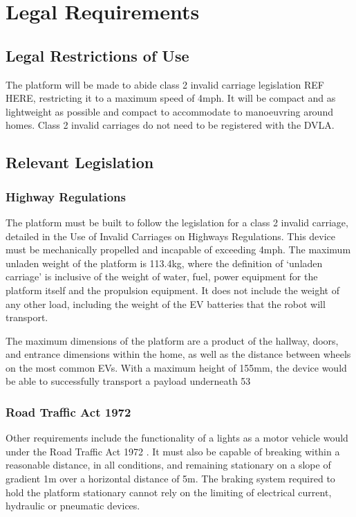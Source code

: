 \documentclass [12pt]{article}
\begin{document}
\section{Legal Requirements}
\subsection{Legal Restrictions of Use}
The platform will be made to abide class 2 invalid carriage legislation REF HERE, restricting it to a maximum speed of 4mph. It will be compact and as lightweight as possible and compact to accommodate to manoeuvring around homes. Class 2 invalid carriages do not need to be registered with the DVLA.

\subsection{Relevant Legislation}
\subsubsection{Highway Regulations}
The platform must be built to follow the legislation for a class 2 invalid carriage, detailed in the Use of Invalid Carriages \cite{Invalid_Legislation} on Highways Regulations. This device must be mechanically propelled and incapable of exceeding 4mph. The maximum unladen weight of the platform is 113.4kg, where the definition of ‘unladen carriage’ is inclusive of the weight of water, fuel, power equipment for the platform itself and the propulsion equipment. It does not include the weight of any other load, including the weight of the EV batteries that the robot will transport.

The maximum dimensions of the platform are a product of the hallway, doors, and entrance dimensions within the home, as well as the distance between wheels on the most common EVs. With a maximum height of 155mm, the device would be able to successfully transport a payload underneath 53%

\subsubsection{Road Traffic Act 1972}
Other requirements include the functionality of a lights as a motor vehicle would under the Road Traffic Act 1972 \cite{Road_Traffic}. It must also be capable of breaking within a reasonable distance, in all conditions, and remaining stationary on a slope of gradient 1m over a horizontal distance of 5m. The braking system required to hold the platform stationary cannot rely on the limiting of electrical current, hydraulic or pneumatic devices.
\end{document}
